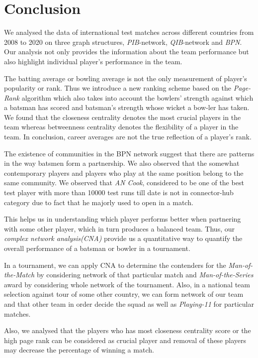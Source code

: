 \documentclass{article}
\begin{document}
\begin{table}[!h]
\end{table}

\section{Conclusion}
We analysed the data of international test matches across different countries from 2008 to 2020 on three graph structures, \textit{PIB}-network, \textit{QIB}-network and \textit{BPN}. Our analysis not only provides the information about the team performance but also highlight individual player's performance in the team.

The batting average or bowling average is not the only measurement of player's popularity or rank. Thus we introduce a new ranking scheme based on the \textit{Page-Rank} algorithm which also takes into account the bowlers' strength against which a batsman has scored and batsman's strength whose wicket a bow-ler has taken. We found that the closeness centrality denotes the most crucial players in the team whereas betweenness centrality denotes the flexibility of a player in the team. In conclusion, career averages are not the true reflection of a player's rank.

The existence of communities in the BPN network suggest that there are patterns in the way batsmen form a partnership. We also observed that the somewhat contemporary players and players who play at the same position belong to the same community. We observed that \textit{AN Cook}, considered to be one of the best test player with more than 10000 test runs till date is not in connector-hub category due to fact that he majorly used to open in  a match. 

This helps us in understanding which player performs better when partnering with some other player, which in turn produces a balanced team. Thus, our \textit{complex network analysis(CNA)} provide us a quantitative way to quantify the overall performance of a batsman or bowler in a tournament. 

In a tournament, we can apply CNA to determine the contenders for the \textit{Man-of-the-Match} by considering network of that particular match and \textit{Man-of-the-Series} award by considering whole network of the tournament. 
Also, in a national team selection against tour of some other country, we can form network of our team and that other team in order decide the squad as well as \textit{Playing-11} for particular matches. 

Also, we analysed that the players who has most closeness centrality score or the high page rank can be considered as crucial player and removal of these players may decrease the percentage of winning a match.\cite{SM2013} \cite{SM2104} 

\printbibliography
\end{document}
